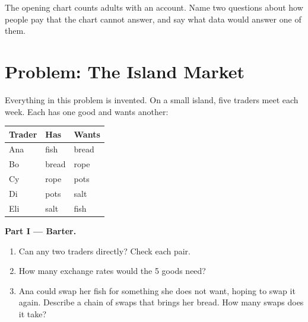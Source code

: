 \begin{exercise}[$\star\star\star$]\label{exo:g7:money:12}
The opening chart counts adults with an account. Name two questions about how people pay
that the chart cannot answer, and say what data would answer one of them.
\end{exercise}

\section{Problem: The Island Market}

\begin{problem}
\label{pb:g7:money:1}
Everything in this problem is invented. On a small island, five traders meet each week.
Each has one good and wants another:
\begin{center}
\begin{tabular}{lll}
\toprule
Trader & Has & Wants \\
\midrule
Ana & fish & bread \\
Bo & bread & rope \\
Cy & rope & pots \\
Di & pots & salt \\
Eli & salt & fish \\
\bottomrule
\end{tabular}
\end{center}

\medskip
\noindent\textbf{Part I --- Barter.}
\begin{enumerate}
  \item Can any two traders  directly? Check each pair.
  \item How many  exchange rates would the 5 goods need?
  \item Ana could swap her fish for something she does not want, hoping to swap it again.
        Describe a chain of swaps that brings her bread. How many swaps does it take?
\end{enumerate}


\end{problem}
